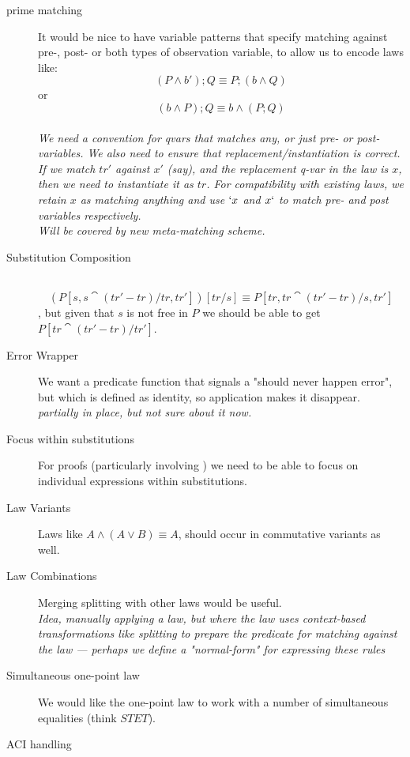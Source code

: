 \begin{description}
  \item[prime matching]
    It would be nice to have variable patterns that specify matching
    against pre-, post- or both types of observation variable,
    to allow us to encode laws like:
    $$
      (P \land b');Q \equiv P;(b \land Q)
    $$
    or
    $$
     (b \land P);Q \equiv b \land (P;Q)
    $$
    \\
    \textit{
      We need a convention for qvars that matches any,
      or just pre- or post-variables.
      We also need to ensure that replacement/instantiation is correct.
      If we match $tr'$ against $x'$ (say), and the replacement q-var
      in the law is $x$, then we need to instantiate it as $tr$.
      For compatibility with existing laws, we retain $x$ as matching
      anything and use $`x$ and $x`$ to match pre- and post
      variables respectively.
      \\
      Will be covered by new meta-matching scheme.
    }
  \item[Substitution Composition]~
     $$(P[s,s\cat(tr'-tr)/tr,tr'])[tr/s] \equiv P[tr,tr\cat(tr'-tr)/s,tr']$$,
     but given that $s$ is not free in $P$ we should be able to get
     $P[tr\cat(tr'-tr)/tr']$.
  \item[Error Wrapper]
    We want a predicate function that signals a "should never happen error",
    but which is defined as identity, so application makes it disappear.
    \\\textit{
      partially in place, but not sure about it now.
    }
  \item[Focus within substitutions]
    For proofs (particularly involving ) we need to be able
    to focus on individual expressions within substitutions.
  \item[Law Variants]
    Laws like $A \land (A \lor B) \equiv A$,
    should occur in commutative variants as well.
  \item[Law Combinations]
    Merging splitting with other laws would be useful.
    \\
    \textit{Idea, manually applying a law, but where the law
    uses context-based transformations like splitting to prepare the predicate
    for matching against the law --- perhaps we define a "normal-form"
    for expressing these rules}
  \item[Simultaneous one-point law]
    We would like the one-point law to work with a number of simultaneous
    equalities (think $STET$).
  \item[ACI handling]

\end{description}
